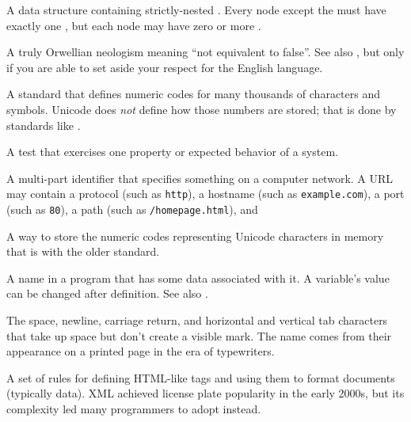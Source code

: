 \begin{description}
A data structure containing strictly-nested . Every node
except the  must have exactly one , but each node may have zero or more
.

A truly Orwellian neologism meaning ``not equivalent to false''. See also
, but only if you are able to set aside your respect for the
English language.

A standard that defines numeric codes for many thousands of characters and
symbols. Unicode does \emph{not} define how those numbers are stored; that is done
by standards like .

A test that exercises one property or expected behavior of a system.

A multi-part identifier that specifies something on a computer network. A URL
may contain a protocol (such as \texttt{http}), a hostname (such as \texttt{example.com}), a
port (such as \texttt{80}), a path (such as \texttt{/homepage.html}), and 

A way to store the numeric codes representing Unicode characters in memory
that is  with the older
 standard.

A name in a program that has some data associated with it. A variable's value
can be changed after definition. See also .

The space, newline, carriage return, and horizontal and vertical tab characters
that take up space but don't create a visible mark.  The name comes from their
appearance on a printed page in the era of typewriters.

A set of rules for defining HTML-like tags and using them to format documents
(typically data). XML achieved license plate popularity in the early 2000s,
but its complexity led many programmers to adopt  instead.

\end{description}
